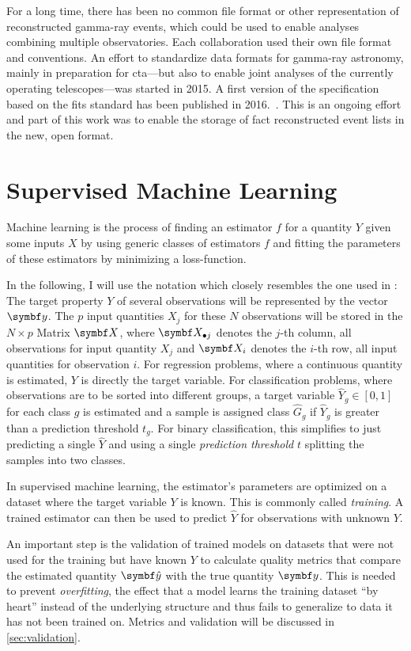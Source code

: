 For a long time, there has been no common file format or other representation of
reconstructed gamma-ray events, which could be used to enable analyses combining
multiple observatories. 
Each collaboration used their own file format and conventions.
An effort to standardize data formats for gamma-ray astronomy,
mainly in preparation for \gls{cta}—but also to enable joint analyses of the
currently operating telescopes—was started in 2015.
A first version of the specification based on the \gls{fits} standard has been published in 2016.~\cite{ogadf,ogadf-proceeding}.
This is an ongoing effort and part of this work was to enable the storage of \gls{fact}
reconstructed event lists in the new, open format.


\section{Supervised Machine Learning}
Machine learning is the process of finding an estimator $f$
for a quantity $Y$ given some inputs $X$ by using generic classes of estimators $f$
and fitting the parameters of these estimators by minimizing a loss-function.

In the following, I will use the notation which closely resembles the one used in
\cite{hasties}: The target property $Y$ of several observations will be represented
by the vector $\m{y}$.
The $p$ input quantities $X_j$ for these $N$ observations will be stored in the $N \times p$
Matrix $\m{X}$, where $\m{X}_{\bullet j}$ denotes the $j$-th column, all observations for
input quantity $X_j$ and $\m{X}_i$ denotes the $i$-th row, all input quantities for
observation $i$. 
For regression problems, where a continuous quantity is estimated, $Y$ is directly the target
variable.
For classification problems, where observations are to be sorted into different groups,
a target variable $\hat{Y}_g \in [0, 1]$ for each class $g$ is estimated and 
a sample is assigned class $\hat{G}_g$ if $\hat{Y}_g$ is greater than a prediction threshold $t_g$.
For binary classification, this simplifies to just predicting a single $\hat{Y}$ and using a single
\emph{prediction threshold} $t$ splitting the samples into two classes.

In supervised machine learning, the estimator's parameters are optimized on 
a dataset where the target variable $Y$ is known.
This is commonly called \emph{training}.
A trained estimator can then be used to predict $\hat{Y}$ for observations with unknown $Y$.

An important step is the validation of trained models on datasets that were not used
for the training but have known $Y$ to calculate quality metrics that compare the 
estimated quantity $\m{\hat{y}}$ with the true quantity $\m{y}$.
This is needed to prevent \emph{overfitting}, the effect that a model learns
the training dataset \enquote{by heart} instead of the underlying structure
and thus fails to generalize to data it has not been trained on.
Metrics and validation will be discussed in \autoref{sec:validation}.


